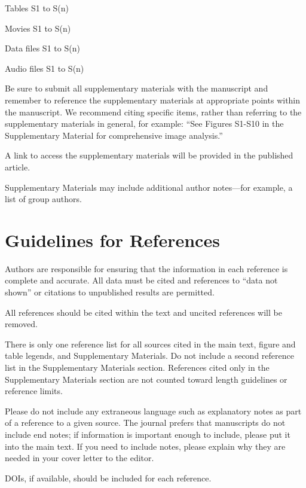 \documentclass{article}
\begin{document}
Tables S1 to S(n) 

Movies S1 to S(n) 

Data files S1 to S(n)  

Audio files S1 to S(n)  

\medskip
Be sure to submit all supplementary materials with the manuscript and remember to reference the supplementary materials at appropriate points within the manuscript. We recommend citing specific items, rather than referring to the supplementary materials in general, for example: ``See Figures S1-S10 in the Supplementary Material for comprehensive image analysis.''

A link to access the supplementary materials will be provided in the published article.

Supplementary Materials may include additional author notes—for example, a list of group authors.

\section*{Guidelines for References}
Authors are responsible for ensuring that the information in each reference is complete and accurate. All data must be cited and references to ``data not shown'' or citations to unpublished results are permitted.

All references should be cited within the text and uncited references will be removed.

There is only one reference list for all sources cited in the main text, figure and table legends, and Supplementary Materials. Do not include a second reference list in the Supplementary Materials section. References cited only in the Supplementary Materials section are not counted toward length guidelines or reference limits.

Please do not include any extraneous language such as explanatory notes as part of a reference to a given source. The journal prefers that manuscripts do not include end notes; if information is important enough to include, please put it into the main text. If you need to include notes, please explain why they are needed in your cover letter to the editor.

DOIs, if available, should be included for each reference.

\printbibliography
\end{document}
